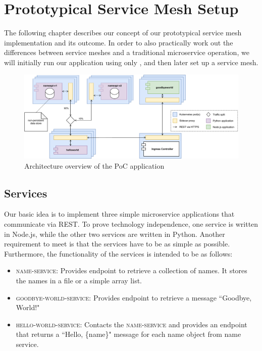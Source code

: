 \section{Prototypical Service Mesh Setup}

The following chapter describes our concept of our prototypical service mesh implementation and its outcome. In order to also practically work out the differences between service meshes and a traditional microservice operation, we will initially run our application using only \kubernetes{}, and then later set up a service mesh.

\begin{figure}
    \centering
    \includegraphics[width=\textwidth]{img/diagram-draft.pdf}
    \caption{Architecture overview of the PoC application}
    \label{fig:poc-overview}
\end{figure}

\subsection{Services}
\label{sec:services}

Our basic idea is to implement three simple microservice applications that communicate via REST. To prove technology independence, one service is written in Node.js, while the other two services are written in Python. Another requirement to meet is that the services have to be as simple as possible. Furthermore, the functionality of the services is intended to be as follows:

\begin{itemize}
\item \textsc{name-service}: Provides endpoint to retrieve a collection of names. It stores the names in a file or a simple array list.
\item \textsc{goodbye-world-service}: Provides endpoint to retrieve a message ``Goodbye, World!"
\item \textsc{hello-world-service}: Contacts the \textsc{name-service} and provides an endpoint that returns a ``Hello, \{name\}" message for each name object from name service.
\end{itemize}

